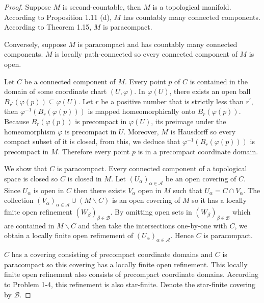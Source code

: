 \begin{proof}
    Suppose \( M \) is second-countable, then \( M \) is a topological manifold. According to Proposition 1.11 (d), \( M \) has countably many connected components. According to Theorem 1.15, \( M \) is paracompact.

    Conversely, suppose \( M \) is paracompact and has countably many connected components. \( M \) is locally path-connected so every connected component of \( M \) is open.

    Let \( C \) be a connected component of \( M \). Every point \( p \) of \( C \) is contained in the domain of some coordinate chart \( (U, \varphi) \). In \( \varphi(U) \), there exists an open ball \( B_{r^{\prime}}(\varphi(p)) \subseteq \varphi(U) \). Let \( r \) be a positive number that is strictly less than \( r^{\prime} \), then \( \varphi^{-1}(B_{r}(\varphi(p))) \) is mapped homeomorphically onto \( B_{r}(\varphi(p)) \). Because \( B_{r}(\varphi(p)) \) is precompact in \( \varphi(U) \), its preimage under the homeomorphism \( \varphi \) is precompact in \( U \). Moreover, \( M \) is Hausdorff so every compact subset of it is closed, from this, we deduce that \( \varphi^{-1}(B_{r}(\varphi(p))) \) is precompact in \( M \). Therefore every point \( p \) is in a precompact coordinate domain.

    We show that \( C \) is paracompact. Every connected component of a topological space is closed so \( C \) is closed in \( M \). Let \( {(U_{\alpha})}_{\alpha \in \mathscr{A}} \) be an open covering of \( C \). Since \( U_{\alpha} \) is open in \( C \) then there exists \( V_{\alpha} \) open in \( M \) such that \( U_{\alpha} = C \cap V_{\alpha} \). The collection \( {(V_{\alpha})}_{\alpha \in \mathscr{A}} \cup (M \smallsetminus C) \) is an open covering of \( M \) so it has a locally finite open refinement \( {(W_{\beta})}_{\beta \in \mathscr{B}} \). By omitting open sets in \( {(W_{\beta})}_{\beta \in \mathscr{B}} \) which are contained in \( M \smallsetminus C \) and then take the intersections one-by-one with \( C \), we obtain a locally finite open refimement of \( {(U_{\alpha})}_{\alpha \in \mathscr{A}} \). Hence \( C \) is paracompact.

    \( C \) has a covering consisting of precompact coordinate domains and \( C \) is paracompact so this covering has a locally finite open refinement. This locally finite open refinement also consists of precompact coordinate domains. According to Problem 1-4, this refinement is also star-finite. Denote the star-finite covering by \( \mathcal{B} \).


\end{proof}
